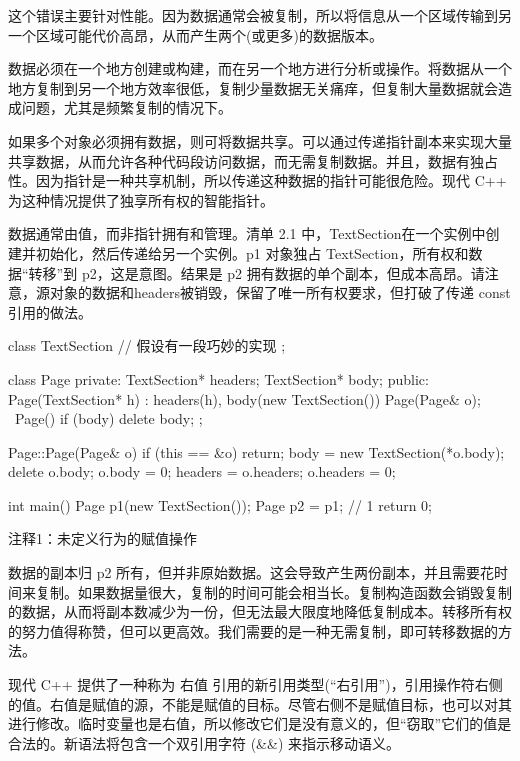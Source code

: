 这个错误主要针对性能。因为数据通常会被复制，所以将信息从一个区域传输到另一个区域可能代价高昂，从而产生两个(或更多)的数据版本。


数据必须在一个地方创建或构建，而在另一个地方进行分析或操作。将数据从一个地方复制到另一个地方效率很低，复制少量数据无关痛痒，但复制大量数据就会造成问题，尤其是频繁复制的情况下。

如果多个对象必须拥有数据，则可将数据共享。可以通过传递指针副本来实现大量共享数据，从而允许各种代码段访问数据，而无需复制数据。并且，数据有独占性。因为指针是一种共享机制，所以传递这种数据的指针可能很危险。现代 C++ 为这种情况提供了独享所有权的智能指针。

数据通常由值，而非指针拥有和管理。清单 2.1 中，TextSection在一个实例中创建并初始化，然后传递给另一个实例。p1 对象独占 TextSection，所有权和数据“转移”到 p2，这是意图。结果是 p2 拥有数据的单个副本，但成本高昂。请注意，源对象的数据和headers被销毁，保留了唯一所有权要求，但打破了传递 const 引用的做法。


\begin{cpp}
class TextSection {
  // 假设有一段巧妙的实现
};

class Page {
private:
  TextSection* headers;
  TextSection* body;
public:
  Page(TextSection* h) : headers(h), body(new TextSection()) {}
  Page(Page& o);
  ~Page() { if (body) delete body; }
};

Page::Page(Page& o) {
  if (this == &o)
    return;
  body = new TextSection(*o.body);
  delete o.body;
  o.body = 0;
  headers = o.headers;
  o.headers = 0;
}

int main() {
  Page p1(new TextSection());
  Page p2 = p1; // 1
  return 0;
}
\end{cpp}

{\footnotesize
注释1：未定义行为的赋值操作
}


数据的副本归 p2 所有，但并非原始数据。这会导致产生两份副本，并且需要花时间来复制。如果数据量很大，复制的时间可能会相当长。复制构造函数会销毁复制的数据，从而将副本数减少为一份，但无法最大限度地降低复制成本。转移所有权的努力值得称赞，但可以更高效。我们需要的是一种无需复制，即可转移数据的方法。


现代 C++ 提供了一种称为 右值 引用的新引用类型(“右引用”)，引用操作符右侧的值。右值是赋值的源，不能是赋值的目标。尽管右侧不是赋值目标，也可以对其进行修改。临时变量也是右值，所以修改它们是没有意义的，但“窃取”它们的值是合法的。新语法将包含一个双引用字符 (\&\&) 来指示移动语义。

